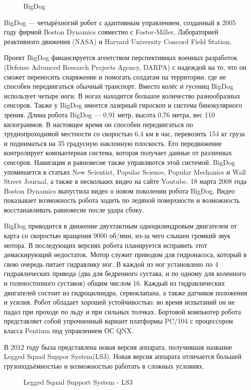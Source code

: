 \begin{figure}[t]
\caption{BigDog}
\end{figure}

BigDog — четырёхногий робот с адаптивным управлением, созданный в 2005 году фирмой Boston Dynamics совместно с Foster-Miller, Лабораторией реактивного движения (NASA) и Harvard University Concord Field Station.

Проект BigDog финансируется агентством перспективных военных разработок (Defense Advanced Research Projects Agency, DARPA) с надеждой на то, что он сможет переносить снаряжение и помогать солдатам на территории, где не способен передвигаться обычный транспорт. Вместо колёс и гусениц BigDog использует четыре ноги. В ногах находится большое количество разнообразных сенсоров. Также у BigDog имеется лазерный гироскоп и система бинокулярного зрения.
Длина робота BigDog — 0,91 метр, высота 0,76 метра, вес 110 килограммов. В настоящее время он способен передвигаться по труднопроходимой местности со скоростью 6,4 км в час, перевозить 154 кг груза и подниматься на 35 градусную наклонную плоскость. Его передвижение контролирует компьютерная система, которая получает данные от различных сенсоров. Навигация и равновесие также управляются этой системой.
BigDog упоминается в статьях New Scientist, Popular Science, Popular Mechanics и Wall Street Journal, а также в нескольких видео на сайте Youtube.
18 марта 2008 года Boston Dynamics выпустила видео о новом поколении робота BigDog. Видео показывает возможность робота ходить по ледяной поверхности и возможность восстанавливать равновесие после удара сбоку.

BigDog приводится в движение двухтактным одноцилиндровым двигателем от карта со скоростью вращения 9000 об/мин, из-за чего слышен громкий звук мотора. В последующих версиях робота планируется исправить этот демаскирующий недостаток. Мотор служит приводом для гидронасоса, который в свою очередь питает гидравлику ног. В каждой из ног установлено по 4 гидравлических привода (два для бедренного сустава, и по одному для коленного и голеностопного суставов) общим числом 16. Каждый из гидравлических двигателей состоит из гидроцилиндра, сервоклапана, а также датчиков положения и усилия. Робот обладает хорошей устойчивостью: во время испытаний он не падал при проходе по льду и при сильных толчках.
Бортовой компьютер робота представляет собой упрочненный вариант платформы PC/104 с процессором класса Pentium под управлением ОС QNX.

В 2012 году была представлена новая версия аппарата, получившая название Legged Squad Suppor System(LS3)\cite{LS3}. Новая версия аппарата отличается большей грузоподъёмностью и возможностью работать в сложных условиях.
\begin{figure}
\caption{Legged Squad Support System - LS3}
\end{figure}

